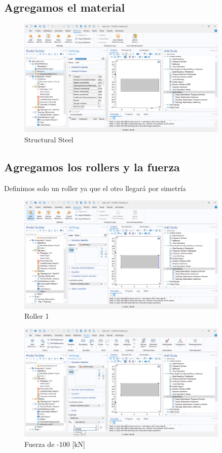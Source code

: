 \documentclass{article}
\theoremstyle{mytheoremstyle}
\theoremstyle{mytheoremstyle}
\theoremstyle{myproblemstyle}
\begin{document}
            \subsection{Agregamos el material}
             \begin{figure}[H]
              \centering
              \includegraphics[width=0.9\textwidth]{mat.png}
              \caption{Structural Steel}
              \label{fig:imagen_x}
            \end{figure}
  \subsection{Agregamos los rollers y la fuerza}
  Definimos solo un roller ya que el otro llegará por simetría
             \begin{figure}[H]
              \centering
              \includegraphics[width=0.9\textwidth]{roll1.png}
              \caption{Roller 1}
              \label{fig:imagen_x}
            \end{figure}

            \begin{figure}[H]
              \centering
              \includegraphics[width=0.9\textwidth]{force.png}
              \caption{Fuerza de -100 [kN]}
              \label{fig:imagen_x}
            \end{figure}
\end{document}
